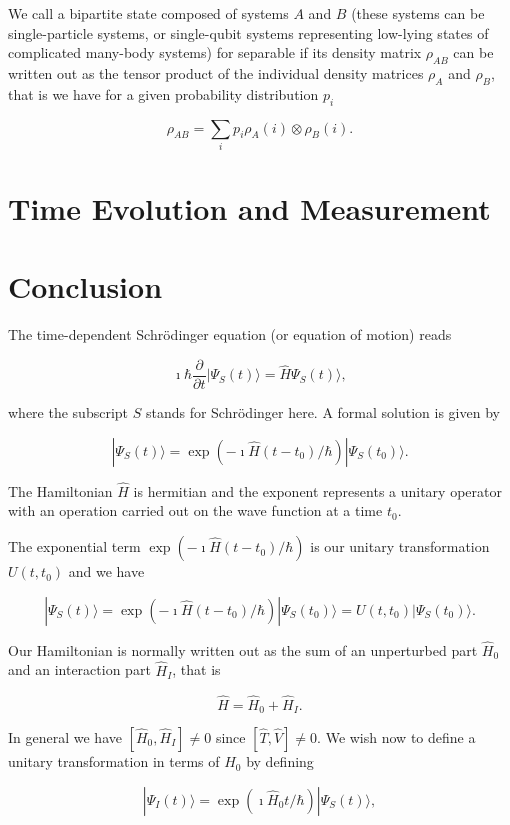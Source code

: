 We call a bipartite state composed of systems $A$ and $B$ (these
systems can be single-particle systems, or single-qubit systems
representing low-lying states of complicated many-body systems) for
separable if its density matrix $\rho_{AB}$ can be written out as the
tensor product of the individual density matrices $\rho_A$ and
$\rho_B$, that is we have for a given probability distribution $p_i$

\[
\rho_{AB}=\sum_ip_i\rho_A(i)\otimes \rho_B(i).
\]



\section{Time Evolution and Measurement}
\section{Conclusion}




The time-dependent Schrödinger equation (or equation of motion) reads

\[
\imath \hbar\frac{\partial }{\partial t}|\Psi_S(t)\rangle = \hat{H}\Psi_S(t)\rangle,
\]

where the subscript $S$ stands for Schrödinger here.
A formal solution is given by 

\[
|\Psi_S(t)\rangle = \exp{(-\imath\hat{H}(t-t_0)/\hbar)}|\Psi_S(t_0)\rangle.
\]


The Hamiltonian $\hat{H}$ is hermitian and the exponent represents a unitary 
operator with an operation carried out on the wave function at a time $t_0$.

The exponential term $\exp{(-\imath\hat{H}(t-t_0)/\hbar)}$ is our
unitary transformation $U(t,t_0)$ and we have

\[
|\Psi_S(t)\rangle = \exp{(-\imath\hat{H}(t-t_0)/\hbar)}|\Psi_S(t_0)\rangle=U(t,t_0)|\Psi_S(t_0)\rangle.
\]



Our Hamiltonian is normally written out as the sum of an unperturbed part $\hat{H}_0$ and an interaction part $\hat{H}_I$, that is

\[
\hat{H}=\hat{H}_0+\hat{H}_I.
\]

In general we have $[\hat{H}_0,\hat{H}_I]\ne 0$ since $[\hat{T},\hat{V}]\ne 0$.
We wish now to define a unitary transformation in terms of $\hat{H}_0$ by defining

\[
|\Psi_I(t)\rangle = \exp{(\imath\hat{H}_0t/\hbar)}|\Psi_S(t)\rangle,
\]

